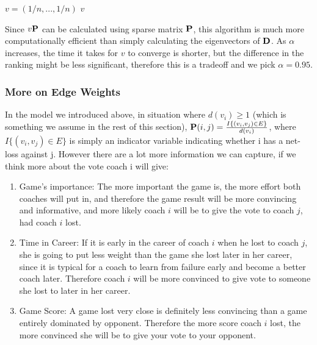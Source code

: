 \documentclass[titlepage]{article}
\begin{document}
\begin{algorithm}[H]

$v = (1/n, ... ,1/n)$\;
\Return $v$\;
\end{algorithm}

\vspace{5mm}

\noindent Since $v {\bf P}$ can be calculated using sparse matrix ${\bf P}$, this algorithm is much more computationally efficient than simply calculating the eigenvectors of ${\bf D}$. As $\alpha$ increases, the time it takes for $v$ to converge is shorter, but the difference in the ranking might be less significant, therefore this is a tradeoff and we pick $\alpha = 0.95$.

\subsubsection*{More on Edge Weights}

\noindent In the model we introduced above, in situation where $d(v_i) \geq 1$ (which is something we assume in the rest of this section), ${\bf P}(i, j) = \frac{ I\{(v_i, v_j) \in E\}}{d(v_i)}$, where $I\{(v_i, v_j) \in E\}$ is simply an indicator variable indicating whether i has a net-loss against j. However there are a lot more information we can capture, if we think more about the vote coach i will give:

\begin{enumerate}
\item Game's importance: The more important the game is, the more effort both coaches will put in, and therefore the game result will be more convincing and informative, and more likely coach $i$ will be to give the vote to coach $j$, had coach $i$ lost.
\item Time in Career: If it is early in the career of coach $i$ when he lost to coach $j$, she is going to put less weight than the game she lost later in her career, since it is typical for a coach to learn from failure early and become a better coach later. Therefore coach $i$ will be more convinced to give vote to someone she lost to later in her career.
\item Game Score: A game lost very close is definitely less convincing than a game entirely dominated by opponent. Therefore the more score coach $i$ lost, the more convinced she will be to give your vote to your opponent.
\end{enumerate}
\end{document}
